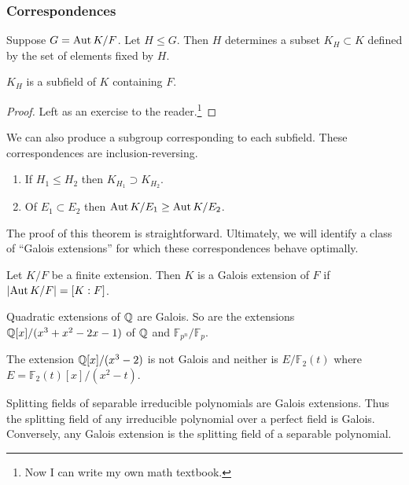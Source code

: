 \documentclass[10pt, twoside]{article}
\newcommand{\F}{\mathbb{F}}
\begin{document}
    \subsubsection{Correspondences}

    Suppose $G = \Aut{K/F}$. Let $H \leq G$. Then $H$ determines a subset $K_H \subset K$ defined by the set of elements fixed by $H$.

    \begin{prop}
        $K_H$ is a subfield of $K$ containing $F$.
        \begin{proof}
            Left as an exercise to the reader.\footnote{Now I can write my own math textbook.}
        \end{proof}
    \end{prop}

    We can also produce a subgroup corresponding to each subfield. These correspondences are inclusion-reversing.

    \begin{thm}
        \begin{enumerate}
            \item If $H_1 \leq H_2$ then $K_{H_1} \supset K_{H_2}$.
            \item Of $E_1 \subset E_2$ then $\Aut{K/E_1} \geq \Aut{K/E_2}$.
        \end{enumerate}
    \end{thm}

    The proof of this theorem is straightforward. Ultimately, we will identify a class of ``Galois extensions'' for which these correspondences behave optimally.

    \begin{defn}
        Let $K/F$ be a finite extension. Then $K$ is a Galois extension of $F$ if $\abs*{\Aut{K/F}} = [K:F]$.
    \end{defn}

    \begin{exm}
        Quadratic extensions of $\Q$ are Galois. So are the extensions $\Q[x]/(x^3+x^2-2x-1)$ of $\Q$ and $\F_{p^n}/\F_p$.
    \end{exm}

    \begin{exm}
        The extension $\Q[x]/(x^3-2)$ is not Galois and neither is $E/\F_2(t)$ where $E = \F_2(t)[x]/(x^2-t)$.
    \end{exm}

    \begin{exm}
        Splitting fields of separable irreducible polynomials are Galois extensions. Thus the splitting field of any irreducible polynomial over a perfect field is Galois. Conversely, any Galois extension is the splitting field of a separable polynomial.
    \end{exm}
\end{document}
